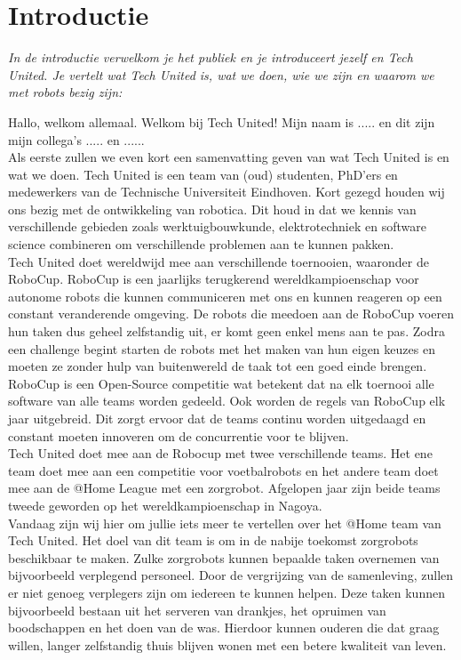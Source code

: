 \documentclass[a4paper,10pt]{article}
\numberwithin{equation}{section}
\numberwithin{figure}{section}
\numberwithin{table}{section}
\begin{document}
\section*{Introductie}
\textit{In de introductie verwelkom je het publiek en je introduceert jezelf en Tech United. Je vertelt wat Tech United is, wat we doen, wie we zijn en waarom we met robots bezig zijn:}\

Hallo, welkom allemaal. Welkom bij Tech United! Mijn naam is ..... en dit zijn mijn collega’s ..... en ...... \\

Als eerste zullen we even kort een samenvatting geven van wat Tech United is en wat we doen. Tech United is een team van (oud) studenten, PhD'ers en medewerkers van de Technische Universiteit Eindhoven. Kort gezegd houden wij ons bezig met de ontwikkeling van robotica. Dit houd in dat we kennis van verschillende gebieden zoals werktuigbouwkunde, elektrotechniek en software science combineren om verschillende problemen aan te kunnen pakken.\\

Tech United doet wereldwijd mee aan verschillende toernooien, waaronder de RoboCup. RoboCup is een jaarlijks terugkerend wereldkampioenschap voor autonome robots die kunnen communiceren met ons en kunnen reageren op een constant veranderende omgeving. De robots die meedoen aan de RoboCup voeren hun taken dus geheel zelfstandig uit, er komt geen enkel mens aan te pas. Zodra een challenge begint starten de robots met het maken van hun eigen keuzes en moeten ze zonder hulp van buitenwereld de taak tot een goed einde brengen. RoboCup is een Open-Source competitie wat betekent dat na elk toernooi alle software van alle teams worden gedeeld. Ook worden de regels van RoboCup elk jaar uitgebreid. Dit zorgt ervoor dat de teams continu worden uitgedaagd en constant moeten innoveren om de concurrentie voor te blijven.\\

Tech United doet mee aan de Robocup met twee verschillende teams. Het ene team doet mee aan een competitie voor voetbalrobots en het andere team doet mee aan de @Home League met een zorgrobot. Afgelopen jaar zijn beide teams tweede geworden op het wereldkampioenschap in Nagoya.\\

Vandaag zijn wij hier om jullie iets meer te vertellen over het @Home team van Tech United. Het doel van dit team is om in de nabije toekomst zorgrobots beschikbaar te maken. Zulke zorgrobots kunnen bepaalde taken overnemen van bijvoorbeeld verplegend personeel. Door de vergrijzing van de samenleving, zullen er niet genoeg verplegers zijn om iedereen te kunnen helpen. Deze taken kunnen bijvoorbeeld bestaan uit het serveren van drankjes, het opruimen van boodschappen en het doen van de was. Hierdoor kunnen ouderen die dat graag willen, langer zelfstandig thuis blijven wonen met een betere kwaliteit van leven.
\end{document}
